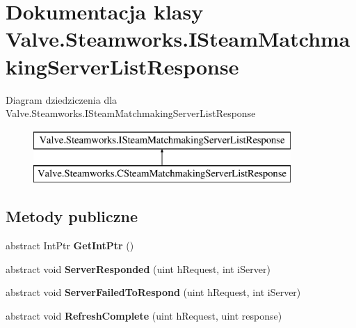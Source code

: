 \hypertarget{class_valve_1_1_steamworks_1_1_i_steam_matchmaking_server_list_response}{}\section{Dokumentacja klasy Valve.\+Steamworks.\+I\+Steam\+Matchmaking\+Server\+List\+Response}
\label{class_valve_1_1_steamworks_1_1_i_steam_matchmaking_server_list_response}
Diagram dziedziczenia dla Valve.\+Steamworks.\+I\+Steam\+Matchmaking\+Server\+List\+Response\begin{figure}[H]
\begin{center}
\leavevmode
\includegraphics[height=2.000000cm]{class_valve_1_1_steamworks_1_1_i_steam_matchmaking_server_list_response}
\end{center}
\end{figure}
\subsection*{Metody publiczne}
\begin{DoxyCompactItemize}
\item 
\mbox{\label{class_valve_1_1_steamworks_1_1_i_steam_matchmaking_server_list_response_a5644de4108eb1f90e428edbed6cc7a5e}} 
abstract Int\+Ptr {\bfseries Get\+Int\+Ptr} ()
\item 
\mbox{\label{class_valve_1_1_steamworks_1_1_i_steam_matchmaking_server_list_response_a7f8ce9bd12a9c599efbbb10a55a67032}} 
abstract void {\bfseries Server\+Responded} (uint h\+Request, int i\+Server)
\item 
\mbox{\label{class_valve_1_1_steamworks_1_1_i_steam_matchmaking_server_list_response_a2df8a9094f7a7623211f5e115c02bf6a}} 
abstract void {\bfseries Server\+Failed\+To\+Respond} (uint h\+Request, int i\+Server)
\item 
\mbox{\label{class_valve_1_1_steamworks_1_1_i_steam_matchmaking_server_list_response_ab5ad02f172b4f9dda9c758b6303a6259}} 
abstract void {\bfseries Refresh\+Complete} (uint h\+Request, uint response)
\end{DoxyCompactItemize}


